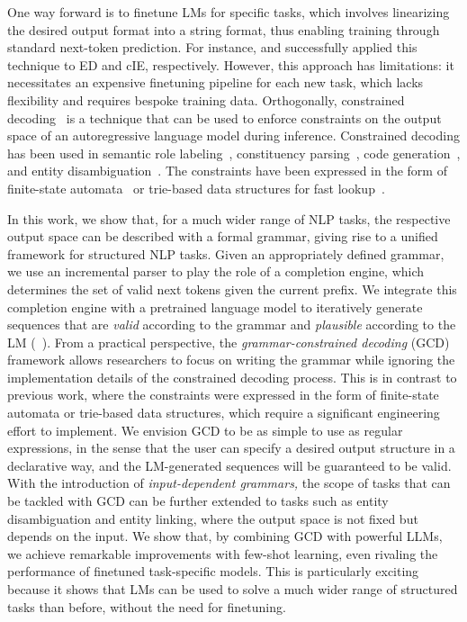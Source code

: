 One way forward is to finetune LMs for specific tasks, which involves linearizing the desired output format into a string format, thus enabling training through standard next-token prediction.
For instance, \citet{decao2021autoregressive} and \citet{josifoski-etal-2022-genie} successfully applied this technique to ED and cIE, respectively.
However, this approach has limitations: it necessitates an expensive finetuning pipeline for each new task, which lacks flexibility and requires bespoke training data.
Orthogonally, constrained decoding~\cite{tromble-eisner-2006-fast} is a technique that can be used to enforce constraints on the output space of an autoregressive language model during inference.
Constrained decoding has been used in semantic role labeling~\cite{deutsch-etal-2019-general}, constituency parsing~\cite{deutsch-etal-2019-general},  code generation~\cite{scholak-etal-2021-picard}, and entity disambiguation~\cite{decao2021autoregressive}.
The constraints have been expressed in the form of finite-state automata~\cite{deutsch-etal-2019-general} or trie-based data structures for fast lookup~\cite{decao2021autoregressive}.


In this work, we show that, for a much wider range of NLP tasks, the respective output space can be described with a formal grammar, giving rise to a unified framework for structured NLP tasks.
Given an appropriately defined grammar, we use an {incremental parser} to play the role of a completion engine, which determines the set of valid next tokens given the current {prefix}.
We integrate this completion engine with a pretrained language model to iteratively generate sequences that are \textit{valid} according to the grammar and \textit{plausible} according to the LM (\cf\ ).
From a practical perspective, the \textit{grammar-constrained decoding} (GCD) framework allows researchers to focus on writing the grammar while ignoring the implementation details of the constrained decoding process.
This is in contrast to previous work, where the constraints were expressed in the form of finite-state automata or trie-based data structures, which require a significant engineering effort to implement.
We envision GCD to be as simple to use as regular expressions, in the sense that the user can specify a desired output structure in a declarative way, and the LM-generated sequences will be guaranteed to be valid.
With the introduction of \textit{input-dependent grammars,} the scope of tasks that can be tackled with GCD can be further extended to tasks such as entity disambiguation and entity linking, where the output space is not fixed but depends on the input.
We show that, by combining GCD with powerful LLMs, we achieve remarkable improvements with few-shot learning, even rivaling the performance of finetuned task-specific models.
This is particularly exciting because it shows that LMs can be used to solve a much wider range of structured tasks than before, without the need for finetuning.



